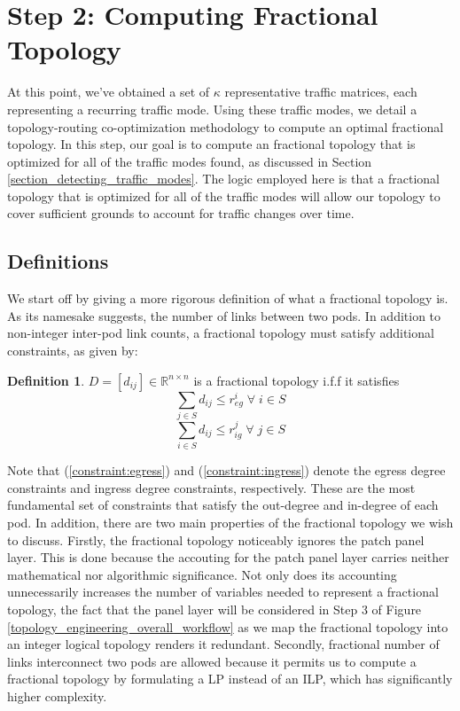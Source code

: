 \documentclass[sigconf]{acmart}
\theoremstyle{definition}
\newtheorem{definition}{Definition}[section]
\begin{document}
\section{Step 2: Computing Fractional Topology}\label{section_fractional_topology}
At this point, we've obtained a set of $\kappa$ representative traffic matrices, each representing a recurring traffic mode. Using these traffic modes, we detail a topology-routing co-optimization methodology to compute an optimal fractional topology. In this step, our goal is to compute an fractional topology that is optimized for all of the traffic modes found, as discussed in Section \ref{section_detecting_traffic_modes}. The logic employed here is that a fractional topology that is optimized for all of the traffic modes will allow our topology to cover sufficient grounds to account for traffic changes over time. 

\subsection{Definitions}
We start off by giving a more rigorous definition of what a fractional topology is. As its namesake suggests, the number of links between two pods. In addition to non-integer inter-pod link counts, a fractional topology must satisfy additional constraints, as given by:

\begin{definition}
$D = [d_{ij}] \in \mathbb{R}^{n \times n}$ is a fractional topology i.f.f it satisfies 
\begin{equation}
\sum\limits_{j \in S} d_{ij} \leq r_{eg}^i \; \forall \; i \in S 
\label{constraint:egress}
\end{equation}
\begin{equation}
\sum\limits_{i \in S} d_{ij} \leq r_{ig}^{ j} \; \forall \; j \in S
\label{constraint:ingress}
\end{equation}
\label{defn:fractional_graph}
\end{definition}
Note that (\ref{constraint:egress}) and (\ref{constraint:ingress}) denote the egress degree constraints and ingress degree constraints, respectively. These are the most fundamental set of constraints that satisfy the out-degree and in-degree of each pod. In addition, there are two main properties of the fractional topology we wish to discuss. Firstly, the fractional topology noticeably ignores the patch panel layer. This is done because the accouting for the patch panel layer carries neither mathematical nor algorithmic significance. Not only does its accounting unnecessarily increases the number of variables needed to represent a fractional topology, the fact that the panel layer will be considered in Step 3 of Figure \ref{topology_engineering_overall_workflow} as we map the fractional topology into an integer logical topology renders it redundant. Secondly, fractional number of links interconnect two pods are allowed because it permits us to compute a fractional topology by formulating a LP instead of an ILP, which has significantly higher complexity.
\end{document}
